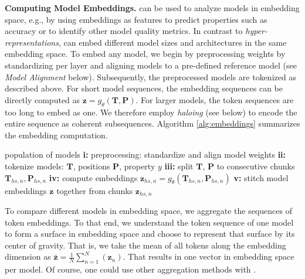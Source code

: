 \textbf{Computing \ourmethod Model Embeddings.}
\ourmethod can be used to analyze models in embedding space, e.g., by using embeddings as features to predict properties such as accuracy or to identify other model quality metrics.
In contrast to \textit{hyper-representations}, \ourmethod can embed different model sizes and architectures in the same embedding space.
To embed any model, we begin by preprocessing weights by standardizing per layer and aligning models to a pre-defined reference model (see \textit{Model Alignment} below).
Subsequently, the preprocessed models are tokenized as described above.
For short model sequences, the embedding sequences can be directly computed as $\mathbf{z} = g_\theta(\mathbf{T},\mathbf{P})$. For larger models, the token sequences are too long to embed as one. We therefore employ \textit{haloing} (see below) to encode the entire sequence as coherent subsequences.
Algorithm \ref{alg:embeddings} summarizes the embedding computation. 
\vspace{-4pt}
\begin{algorithm}[]
   \caption{\ourmethod model embedding computation}
   \label{alg:embeddings}
\begin{algorithmic}
     population of models
    \STATE \textbf{i:} preprocessing: standardize and align model weights
    \STATE \textbf{ii:} tokenize models: $\mathbf{T}$, positions $\mathbf{P}$, property $y$
    \STATE \textbf{iii:} split $\mathbf{T}$, $\mathbf{P}$ to consecutive chunks $\mathbf{T}_{hs,n}, \mathbf{P}_{hs,n}$ 
    \STATE \textbf{iv:} compute embeddings $\mathbf{z}_{hs,n} = g_{\theta}(\mathbf{T}_{hs,n},\mathbf{P}_{hs,n})$
    \STATE \textbf{v:} stitch model embeddings $\mathbf{z}$ together from chunks $\mathbf{z}_{hs,n}$
\end{algorithmic}
\end{algorithm}
\vspace{-8pt}
To compare different models in embedding space, we aggregate the sequences of token embeddings. To that end, we understand the token sequence of one model to form a surface in embedding space and choose to represent that surface by its center of gravity. That is, we take the mean of all tokens along the embedding dimension as $\mathbf{\bar{z}} = \frac{1}{N} \sum_{n=1}^N(\mathbf{z}_n)$. That results in one vector in embedding space per model. Of course, one could use other aggregation methods with \ourmethod.

